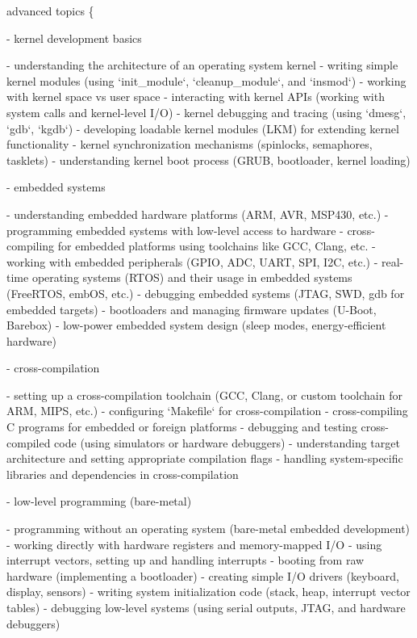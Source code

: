 advanced topics \{ \begin{DoxyVerb}- kernel development basics {

    - understanding the architecture of an operating system kernel
    - writing simple kernel modules (using `init_module`, `cleanup_module`, and `insmod`)
    - working with kernel space vs user space
    - interacting with kernel APIs (working with system calls and kernel-level I/O)
    - kernel debugging and tracing (using `dmesg`, `gdb`, `kgdb`)
    - developing loadable kernel modules (LKM) for extending kernel functionality
    - kernel synchronization mechanisms (spinlocks, semaphores, tasklets)
    - understanding kernel boot process (GRUB, bootloader, kernel loading)

}

- embedded systems {

    - understanding embedded hardware platforms (ARM, AVR, MSP430, etc.)
    - programming embedded systems with low-level access to hardware
    - cross-compiling for embedded platforms using toolchains like GCC, Clang, etc.
    - working with embedded peripherals (GPIO, ADC, UART, SPI, I2C, etc.)
    - real-time operating systems (RTOS) and their usage in embedded systems (FreeRTOS, embOS, etc.)
    - debugging embedded systems (JTAG, SWD, gdb for embedded targets)
    - bootloaders and managing firmware updates (U-Boot, Barebox)
    - low-power embedded system design (sleep modes, energy-efficient hardware)

}

- cross-compilation {

    - setting up a cross-compilation toolchain (GCC, Clang, or custom toolchain for ARM, MIPS, etc.)
    - configuring `Makefile` for cross-compilation
    - cross-compiling C programs for embedded or foreign platforms
    - debugging and testing cross-compiled code (using simulators or hardware debuggers)
    - understanding target architecture and setting appropriate compilation flags
    - handling system-specific libraries and dependencies in cross-compilation

}

- low-level programming (bare-metal) {

    - programming without an operating system (bare-metal embedded development)
    - working directly with hardware registers and memory-mapped I/O
    - using interrupt vectors, setting up and handling interrupts
    - booting from raw hardware (implementing a bootloader)
    - creating simple I/O drivers (keyboard, display, sensors)
    - writing system initialization code (stack, heap, interrupt vector tables)
    - debugging low-level systems (using serial outputs, JTAG, and hardware debuggers)

}
\end{DoxyVerb}

